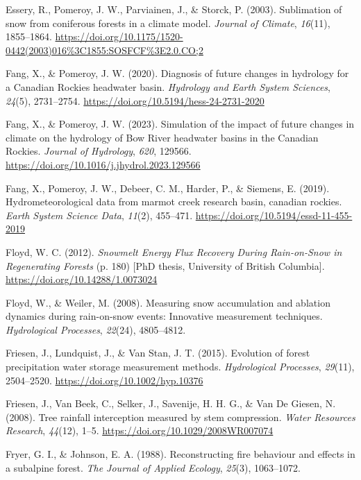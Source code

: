 \documentclass[
  letterpaper,
]{tex/uofsthesis-cs}
\newlength{\cslhangindent}
\newenvironment{CSLReferences}[2] %
 {\begin{list}{}{%
  \setlength{\itemindent}{0pt}
  \setlength{\leftmargin}{0pt}
  \setlength{\parsep}{0pt}
  \ifodd #1
   \setlength{\leftmargin}{\cslhangindent}
   \setlength{\itemindent}{-1\cslhangindent}
  \fi
  \setlength{\itemsep}{#2\baselineskip}}}
 {\end{list}}
\begin{document}
\begin{CSLReferences}{1}{0}
Essery, R., Pomeroy, J. W., Parviainen, J., \& Storck, P. (2003).
Sublimation of snow from coniferous forests in a climate model.
\emph{Journal of Climate}, \emph{16}(11), 1855--1864.
\url{https://doi.org/10.1175/1520-0442(2003)016\%3C1855:SOSFCF\%3E2.0.CO;2}

Fang, X., \& Pomeroy, J. W. (2020). Diagnosis of future changes in
hydrology for a {Canadian Rockies} headwater basin. \emph{Hydrology and
Earth System Sciences}, \emph{24}(5), 2731--2754.
\url{https://doi.org/10.5194/hess-24-2731-2020}

Fang, X., \& Pomeroy, J. W. (2023). Simulation of the impact of future
changes in climate on the hydrology of {Bow River} headwater basins in
the {Canadian Rockies}. \emph{Journal of Hydrology}, \emph{620}, 129566.
\url{https://doi.org/10.1016/j.jhydrol.2023.129566}

Fang, X., Pomeroy, J. W., Debeer, C. M., Harder, P., \& Siemens, E.
(2019). Hydrometeorological data from marmot creek research basin,
canadian rockies. \emph{Earth System Science Data}, \emph{11}(2),
455--471. \url{https://doi.org/10.5194/essd-11-455-2019}

Floyd, W. C. (2012). \emph{Snowmelt {Energy Flux Recovery During
Rain-on-Snow} in {Regenerating Forests}} (p. 180) {[}PhD thesis,
University of British Columbia{]}.
\url{https://doi.org/10.14288/1.0073024}

Floyd, W., \& Weiler, M. (2008). Measuring snow accumulation and
ablation dynamics during rain-on-snow events: Innovative measurement
techniques. \emph{Hydrological Processes}, \emph{22}(24), 4805--4812.

Friesen, J., Lundquist, J., \& Van Stan, J. T. (2015). Evolution of
forest precipitation water storage measurement methods.
\emph{Hydrological Processes}, \emph{29}(11), 2504--2520.
\url{https://doi.org/10.1002/hyp.10376}

Friesen, J., Van Beek, C., Selker, J., Savenije, H. H. G., \& Van De
Giesen, N. (2008). Tree rainfall interception measured by stem
compression. \emph{Water Resources Research}, \emph{44}(12), 1--5.
\url{https://doi.org/10.1029/2008WR007074}

Fryer, G. I., \& Johnson, E. A. (1988). Reconstructing fire behaviour
and effects in a subalpine forest. \emph{The Journal of Applied
Ecology}, \emph{25}(3), 1063--1072.


\end{CSLReferences}
\end{document}
